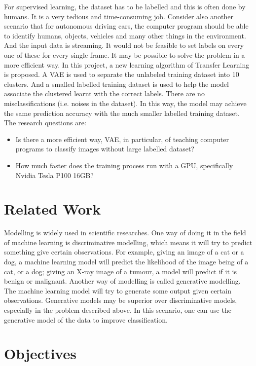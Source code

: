 \documentclass[11pt,a4paper]{report}
\begin{document}
For supervised learning, the dataset has to be labelled and this is often done by humans. It is a very tedious and time-consuming job. Consider also another scenario that for autonomous driving cars, the computer program should be able to identify humans, objects, vehicles and many other things in the environment. And the input data is streaming. It would not be feasible to set labels on every one of these for every single frame. It may be possible to solve the problem in a more efficient way. In this project, a new learning algorithm of Transfer Learning is proposed. A VAE is used to separate the unlabeled training dataset into 10 clusters. And a smalled labelled training dataset is used to help the model associate the clustered learnt with the correct labels. There are no misclassifications (i.e. noises in the dataset). In this way, the model may achieve the same prediction accuracy with the much smaller labelled training dataset. The research questions are:

\begin{itemize}
    \item Is there a more efficient way, VAE, in particular, of teaching computer programs to classify images without large labelled dataset?
    \item How much faster does the training process run with a GPU, specifically Nvidia Tesla P100 16GB?
\end{itemize}


\section{Related Work}

Modelling is widely used in scientific researches. One way of doing it in the field of machine learning is discriminative modelling, which means it will try to predict something give certain observations. For example, giving an image of a cat or a dog, a machine learning model will predict the likelihood of the image being of a cat, or a dog; giving an X-ray image of a tumour, a model will predict if it is benign or malignant. Another way of modelling is called generative modelling. The machine learning model will try to generate some output given certain observations. Generative models may be superior over discriminative models, especially in the problem described above. In this scenario, one can use the generative model of the data to improve classification\cite{kingma2014}.

\section{Objectives}
\label{sec:name}
\end{document}
